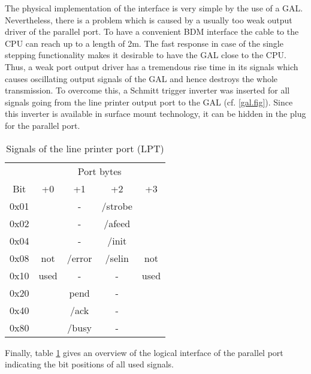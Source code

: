 \documentclass[12pt]{article}
\newcommand{\btab}[1]{\begin{table}[htbp]\begin{center}\begin{tabular}{#1}}
\newcommand{\etab}[2]{\end{tabular}\caption{\label{#1} #2}%
                      \end{center}\end{table}}
\begin{document}
The physical implementation of the interface is very simple by the use
of a GAL. Nevertheless, there is a problem which is caused by a
usually too weak output driver of the parallel port. To have a
convenient BDM interface the cable to the CPU can reach up to a length
of 2m. The fast response in case of the single stepping functionality
makes it desirable to have the GAL close to the CPU. Thus, a weak port
output driver has a tremendous rise time in its signals which causes
oscillating output signals of the GAL and hence destroys the whole
transmission. To overcome this, a Schmitt trigger inverter was
inserted for all signals going from the line printer output port to
the GAL (cf. \ref{gal.fig}). Since this inverter is available in
surface mount technology, it can be hidden in the plug for the
parallel port.

\btab{|c||c|c|c|c|}
\hline
    & \multicolumn{4}{c|}{Port bytes} \\ \cline{2-5}
Bit & +0 & +1 & +2 & +3 \\ \hline\hline
0x01 &      & -      & /strobe &      \\ \cline{3-4}
0x02 &      & -      & /afeed  &      \\ \cline{3-4}
0x04 &      & -      & /init   &      \\ \cline{3-4}
0x08 & not  & /error & /selin  & not  \\ \cline{3-4}
0x10 & used & -      & -       & used \\ \cline{3-4}
0x20 &      & pend   & -       &      \\ \cline{3-4}
0x40 &      & /ack   & -       &      \\ \cline{3-4}
0x80 &      & /busy  & -       &      \\ \hline
\etab{lptport}{Signals of the line printer port (LPT)}

Finally, table \ref{lptport} gives an overview of the logical
interface of the parallel port indicating the bit positions of all
used signals.
\end{document}
